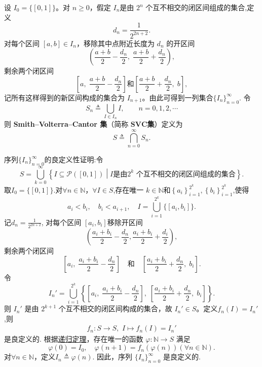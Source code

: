 \documentclass[../../main.tex]{subfiles}%
\begin{document}
\begin{definition}\label{definition:Smith-Volterra-Cantor集(SVC集)}
设 \( I_0 = \{[0,1]\} \)。对 \( n \geqslant 0 \)，假定 \( I_n \)是由 \( 2^n \) 个互不相交的闭区间组成的集合,定义
\[
d_n = \frac{1}{2^{2n+2}}.
\]
对每个区间 \([a,b] \in I_n\)，移除其中点附近长度为 \( d_n \) 的开区间
\[
\left( \frac{a+b}{2} - \frac{d_n}{2},\; \frac{a+b}{2} + \frac{d_n}{2} \right),
\]
剩余两个闭区间
\[
\left[ a,\; \frac{a+b}{2} - \frac{d_n}{2} \right]\text{和}\left[ \frac{a+b}{2} + \frac{d_n}{2},\; b \right],
\]
记所有这样得到的新区间构成的集合为 \( I_{n+1} \)。由此可得到一列集合$\{I_n\}_{n=0}^{\infty}$.
令
\[
S_n \triangleq \bigcup_{I \in I_n} I, \qquad n = 0,1,2,\cdots
\]
则 \textbf{Smith–Volterra–Cantor 集}（简称 $\mathbf{SVC}$\textbf{集}）定义为
\[
S \triangleq \bigcap_{n=0}^{\infty} S_n  .
\]
\end{definition}
\begin{remark}
序列\(\{I_n\}_{n=0}^{\infty}\)的良定义性证明:令
\[
S = \bigcup_{k=0}^{\infty} \left\{ I \subseteq \mathcal{P}([0,1])  \middle| I \text{是由} 2^k \text{ 个互不相交的闭区间组成的集合} \right\}.
\]
取$I_0=\{[0,1]\}$.对\(\forall n \in \mathbb{N}\)，\(\forall I \in S\),存在唯一 \(k\in \mathbb{N}\)和$\left\{ a_i \right\} _{i=1}^{2^k},\left\{ b_i \right\} _{i=1}^{2^k}$,使得
\[
a_i<b_i,\quad b_i<a_{i+1},\quad I=\bigcup_{i=1}^{2^k}{\{\left[ a_i,b_i \right]\}}.
\]
记$d_n = \frac{1}{2^{2n+2}}$,
对每个区间 \([a_i, b_i]\)移除开区间
\[
\left( \frac{a_i+b_i}{2}-\frac{d_n}{2},\frac{a_i+b_i}{2}+\frac{d_i}{2} \right) ,
\]
剩余两个闭区间
\[
\left[ a_i,\;\frac{a_i+b_i}{2}-\frac{d_n}{2} \right] \quad \text{和}\quad \left[ \frac{a_i+b_i}{2}+\frac{d_n}{2},\;b_i \right] .
\]
令
\[
I_n' =\bigcup_{i=1}^{2^k}{\left\{ \left[ a_i,\;\frac{a_i+b_i}{2}-\frac{d_n}{2} \right] ,\;\left[ \frac{a_i+b_i}{2}+\frac{d_n}{2},\;b_i \right] \right\}}.
\]
则 \(I_n'\) 是由 \(2^{k+1}\) 个互不相交的闭区间构成的集合，故 \(I_n' \in S\)。定义$f_n(I) = I_n'$,则
\begin{align*}
f_n:S\to S,\,\,I\mapsto f_n(I)=I_n'
\end{align*}
是良定义的.
根据\hyperref[Set-Theory-theorem:逆归定理]{递归定理}，存在唯一的函数 \(\varphi : \mathbb{N} \to S\) 满足
\[
\varphi(0) = I_0,\quad \varphi(n+1) = f_n(\varphi(n))(\forall n \in \mathbb{N}).
\]
对\(\forall n \in \mathbb{N}\)，定义$I_n \triangleq \varphi(n).$
因此，序列 \(\{I_n\}_{n=0}^{\infty}\) 是良定义的.
\end{remark}
\end{document}
